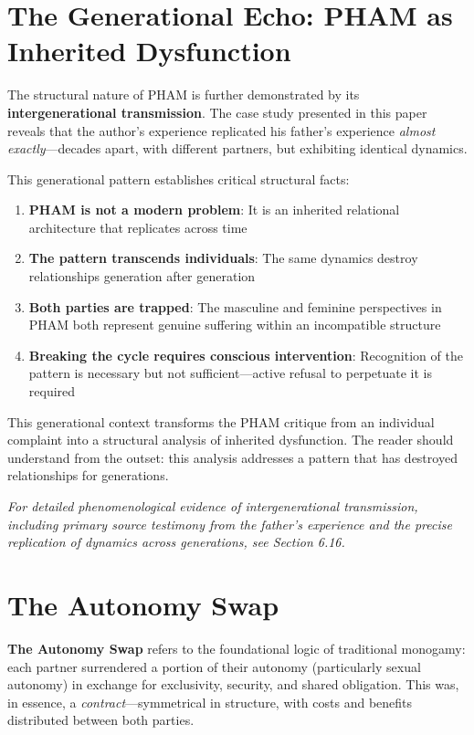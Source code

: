 \documentclass[12pt,openany]{book}
\numberwithin{equation}{chapter}
\begin{document}
\section{The Generational Echo: PHAM as Inherited Dysfunction}

The structural nature of PHAM is further demonstrated by its \textbf{intergenerational transmission}. The case study presented in this paper reveals that the author's experience replicated his father's experience \textit{almost exactly}---decades apart, with different partners, but exhibiting identical dynamics.

This generational pattern establishes critical structural facts:

\begin{enumerate}
    \item \textbf{PHAM is not a modern problem}: It is an inherited relational architecture that replicates across time
    \item \textbf{The pattern transcends individuals}: The same dynamics destroy relationships generation after generation
    \item \textbf{Both parties are trapped}: The masculine and feminine perspectives in PHAM both represent genuine suffering within an incompatible structure
    \item \textbf{Breaking the cycle requires conscious intervention}: Recognition of the pattern is necessary but not sufficient---active refusal to perpetuate it is required
\end{enumerate}

This generational context transforms the PHAM critique from an individual complaint into a structural analysis of inherited dysfunction. The reader should understand from the outset: this analysis addresses a pattern that has destroyed relationships for generations.

\textit{For detailed phenomenological evidence of intergenerational transmission, including primary source testimony from the father's experience and the precise replication of dynamics across generations, see Section 6.16.}

\section{The Autonomy Swap}

\textbf{The Autonomy Swap} refers to the foundational logic of traditional monogamy: each partner surrendered a portion of their autonomy (particularly sexual autonomy) in exchange for exclusivity, security, and shared obligation. This was, in essence, a \textit{contract}---symmetrical in structure, with costs and benefits distributed between both parties.
\end{document}
